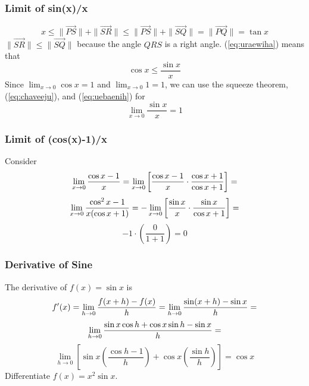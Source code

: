 \documentclass[xcolor=dvipsnames]{beamer}
\begin{document}
\begin{frame}
  \frametitle{Limit of sin(x)/x}
  \begin{equation}
    \label{eq:uraewiha}
    x\leq\|\vec{PS}\|+\|\vec{SR}\|\leq\|\vec{PS}\|+\|\vec{SQ}\|=\|\vec{PQ}\|=\tan{}x
  \end{equation}
$\|\vec{SR}\|\leq\|\vec{SQ}\|$ because the angle $QRS$ is a right angle.
(\ref{eq:uraewiha}) means that
\begin{equation}
  \label{eq:uebaenih}
  \cos{}x\leq\frac{\sin{}x}{x}
\end{equation}
Since $\lim_{x\rightarrow{}0}\cos{}x=1$ and $\lim_{x\rightarrow{}0}1=1$, we can use the squeeze
theorem, (\ref{eq:chaveeju}), and (\ref{eq:uebaenih}) for
\begin{equation}
  \label{eq:guabighe}
  \lim_{x\rightarrow{}0}\frac{\sin{}x}{x}=1
\end{equation}
\end{frame}

\begin{frame}
  \frametitle{Limit of (cos(x)-1)/x}
  Consider
  \begin{equation}
    \label{eq:ungaeciz}
    \lim_{x\rightarrow{}0}\frac{\cos{}x-1}{x}=\lim_{x\rightarrow{}0}\left[\frac{\cos{}x-1}{x}\cdot\frac{\cos{}x+1}{\cos{}x+1}\right]=\notag
  \end{equation}
  \begin{equation}
    \label{eq:xiecahze}
    \lim_{x\rightarrow{}0}\frac{\cos^{2}x-1}{x(\cos{}x+1)}=-\lim_{x\rightarrow{}0}\left[\frac{\sin{}x}{x}\cdot\frac{\sin{}x}{\cos{}x+1}\right]=\notag
  \end{equation}
  \begin{equation}
    \label{eq:angoohee}
    -1\cdot\left(\frac{0}{1+1}\right)=0
  \end{equation}
\end{frame}

\begin{frame}
  \frametitle{Derivative of Sine}
  The derivative of $f(x)=\sin{}x$ is 
\begin{equation}
  \label{eq:eishooro}
  f'(x)=\lim_{h\rightarrow{}0}\frac{f(x+h)-f(x)}{h}=\lim_{h\rightarrow{}0}\frac{\sin(x+h)-\sin{}x}{h}=\notag
\end{equation}
\begin{equation}
  \label{eq:phauzelo}
  \lim_{h\rightarrow{}0}\frac{\sin{}x\cos{}h+\cos{}x\sin{}h-\sin{}x}{h}=\notag
\end{equation}
\begin{equation}
  \label{eq:jiexeedo}
  \lim_{h\rightarrow{}0}\left[\sin{}x\left(\frac{\cos{}h-1}{h}\right)+\cos{}x\left(\frac{\sin{}h}{h}\right)\right]=\cos{}x
\end{equation}
{\ubung} Differentiate $f(x)=x^{2}\sin{}x$.
\end{frame}
\end{document}
